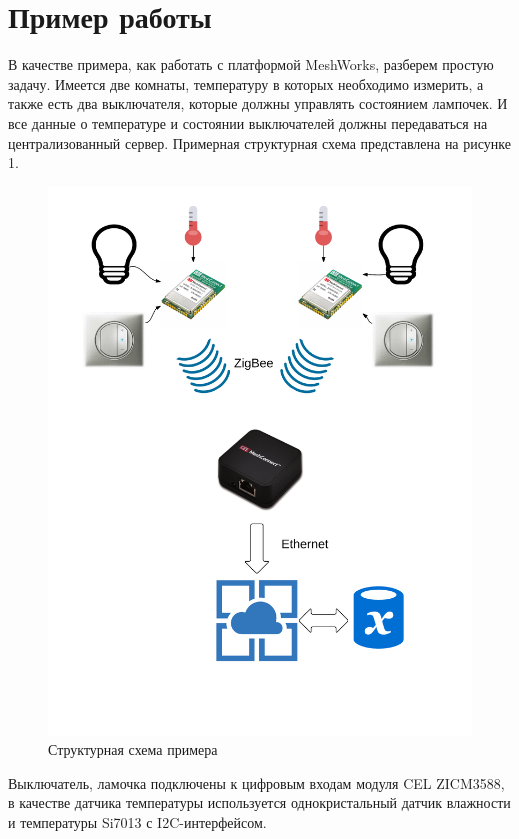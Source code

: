 \documentclass[11pt]{article}
\begin{document}
\section{Пример работы}
В качестве примера, как работать с платформой MeshWorks, разберем простую задачу. 
Имеется две комнаты, температуру в которых необходимо измерить, а также есть два выключателя, 
которые должны управлять состоянием лампочек. И все данные о температуре и состоянии
выключателей должны передаваться на централизованный сервер. Примерная структурная
схема представлена на рисунке 1.
\begin{figure}[h!]
    \centering
    \includegraphics[scale=0.5]{cel-structure.png}
    \caption{Структурная схема примера}
\end{figure}

Выключатель, ламочка подключены к цифровым входам модуля CEL ZICM3588, в качестве
датчика температуры используется однокристальный датчик влажности и температуры
Si7013 с I2C-интерфейсом.
\end{document}
